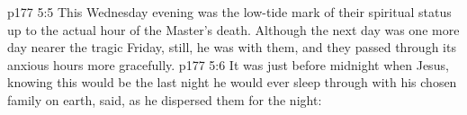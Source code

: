 \vs p177 5:5 This Wednesday evening was the low\hyp{}tide mark of their spiritual status up to the actual hour of the Master’s death. Although the next day was one more day nearer the tragic Friday, still, he was with them, and they passed through its anxious hours more gracefully.
\vs p177 5:6 It was just before midnight when Jesus, knowing this would be the last night he would ever sleep through with his chosen family on earth, said, as he dispersed them for the night: 
\quizlink
